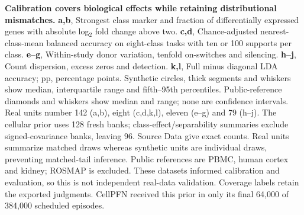 \textbf{Calibration covers biological effects while retaining distributional mismatches.} \textbf{a,b}, Strongest class marker and fraction of differentially expressed genes with absolute log$_2$ fold change above two. \textbf{c,d}, Chance-adjusted nearest-class-mean balanced accuracy on eight-class tasks with ten or 100 supports per class. \textbf{e--g}, Within-study donor variation, tenfold on-switches and silencing. \textbf{h--j}, Count dispersion, excess zeros and detection. \textbf{k,l}, Full minus diagonal LDA accuracy; pp, percentage points. Synthetic circles, thick segments and whiskers show median, interquartile range and fifth--95th percentiles. Public-reference diamonds and whiskers show median and range; none are confidence intervals. Real units number 142 (a,b), eight (c,d,k,l), eleven (e--g) and 79 (h--j). The cellular prior uses 128 fresh banks; class-effect/separability summaries exclude signed-covariance banks, leaving 96. Source Data give exact counts. Real units summarize matched draws whereas synthetic units are individual draws, preventing matched-tail inference. Public references are PBMC, human cortex and kidney; ROSMAP is excluded. These datasets informed calibration and evaluation, so this is not independent real-data validation. Coverage labels retain the exported judgments. CellPFN received this prior in only its final 64,000 of 384,000 scheduled episodes.
